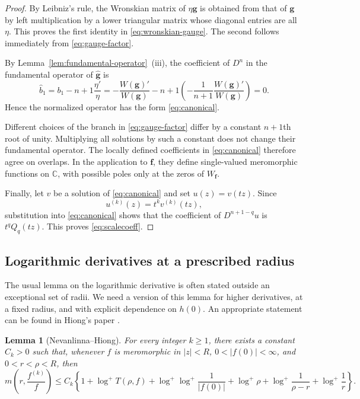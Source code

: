 \documentclass[12pt,letterpaper,reqno]{amsart}
\newtheorem{lem}[thm]{Lemma}
\theoremstyle{definition}
\numberwithin{equation}{section}
\newcommand{\C}{\mathbb C}
\newcommand{\fv}{\bm f}
\newcommand{\gv}{\bm g}
\begin{document}
\begin{proof}
By Leibniz's rule, the Wronskian matrix of \(\eta\gv\) is obtained from that
of \(\gv\) by left multiplication by a lower triangular matrix whose
diagonal entries are all \(\eta\). This proves the first identity in
\eqref{eq:wronskian-gauge}. The second follows immediately from
\eqref{eq:gauge-factor}.

By Lemma~\ref{lem:fundamental-operator}~(iii), the coefficient of \(D^{n}\) in the fundamental
operator of \(\widehat{\gv}\) is
\[
\widehat b_1
=b_1-{n+1}\frac{\eta'}{\eta}
=-\frac{W(\gv)'}{W(\gv)}
-{n+1}\left(-\frac1{n+1}\frac{W(\gv)'}{W(\gv)}\right)
=0.
\]
Hence the normalized operator has the form \eqref{eq:canonical}.

Different choices of the branch in \eqref{eq:gauge-factor} differ by a
constant \({n+1}\)th root of unity. Multiplying all solutions by such a constant
does not change their fundamental operator. The locally defined coefficients
in \eqref{eq:canonical} therefore agree on overlaps. In the application to
\(\fv\), they define single-valued meromorphic functions on \(\C\), with
possible poles only at the zeros of \(W_{\fv}\).

Finally, let \(v\) be a solution of \eqref{eq:canonical} and set
\(u(z)=v(tz)\). Since
\[
 u^{(k)}(z)=t^k v^{(k)}(tz),
\]
substitution into \eqref{eq:canonical} shows that the coefficient of
\(D^{n+1-q}u\) is \(t^qQ_q(tz)\). This proves \eqref{eq:scalecoeff}.
\end{proof}



\subsection{Logarithmic derivatives at a prescribed radius}

The usual lemma on the logarithmic derivative is often stated
outside an exceptional
set of radii. We need a version of this lemma for higher
derivatives, at a fixed radius,
and with explicit dependence on $h(0)$. An appropriate statement
can be found in Hiong's paper \cite{Hiong}.

\begin{lem}[Nevanlinna--Hiong]\label{lem:NH}
For every integer \(k\ge1\), there exists a constant \(C_k>0\) such that, whenever \(f\) is meromorphic in \(|z|<R\), \(0<|f(0)|<\infty\), and
\(0<r<\rho<R\), then
\[
m\!\left(r,\frac{f^{(k)}}{f}\right)
\le C_k\left\{
1+\log^+T(\rho,f)
+\log^+\log^+\frac{1}{|f(0)|}
+\log^+\rho
+\log^+\frac{1}{\rho-r}
+\log^+\frac{1}{r}
\right\}.
\]
\end{lem}
\end{document}
